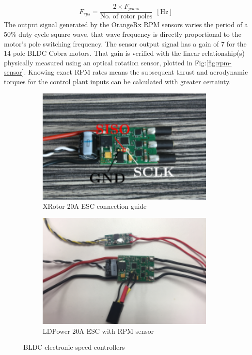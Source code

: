 \begin{equation}
F_{rps}=\frac{2\times F_{poles}}{\text{No. of rotor poles}}~~[\text{Hz}]
\end{equation}
The output signal generated by the OrangeRx RPM sensors varies the period of a 50\% duty cycle square wave, that wave frequency is directly proportional to the motor's pole switching frequency. The sensor output signal has a gain of 7 for the 14 pole BLDC Cobra motors. That gain is verified with the linear relationship(s) physically measured using an optical rotation sensor, plotted in Fig:\ref{fig:rpm-sensor}. Knowing exact RPM rates means the subsequent thrust and aerodynamic torques for the control plant inputs can be calculated with greater certainty.
\par
\begin{figure}[hbtp]
\begin{subfigure}{0.5\textwidth}
\centering
\includegraphics[width=0.98\textwidth]{figs/xrotor-20A}
\caption{XRotor 20A ESC connection guide\cite{xrotor}}
\label{fig:xrotor-20A}
\end{subfigure}
\begin{subfigure}{0.5\textwidth}
\centering
\includegraphics[width=0.98\textwidth]{figs/ldpower-20A}
\caption{LDPower 20A ESC with RPM sensor}
\label{fig:ldpower-20A}
\end{subfigure}
\vspace{-8pt}
\caption{BLDC electronic speed controllers}
\vspace{-8pt}
\end{figure}
